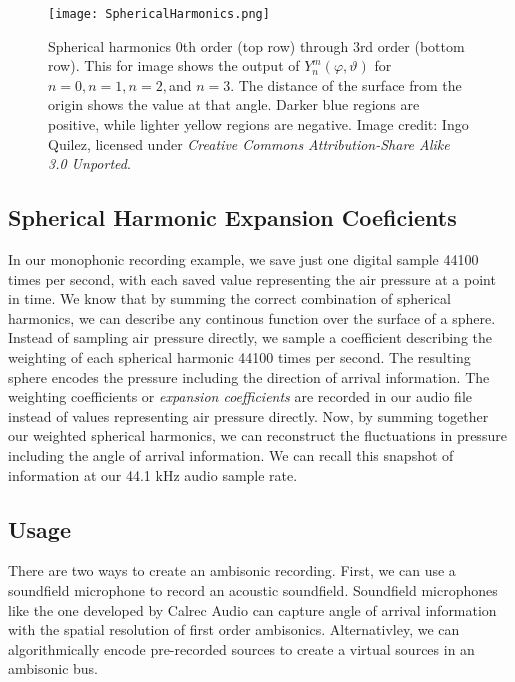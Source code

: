\begin{figure}[h]
  \texttt{[image: SphericalHarmonics.png]}
  \caption{Spherical harmonics $0$th order (top row) through $3$rd
    order (bottom row). This for image shows the output of
    $Y_{n}^{m}(\varphi,\vartheta)$ for $n=0,n=1,n=2,$and $n=3$. The
    distance of the surface from the origin shows the value at that
    angle. Darker blue regions are positive, while lighter yellow
    regions are negative. Image credit: Ingo Quilez, licensed under
    \textit{Creative Commons Attribution-Share Alike 3.0 Unported}.}
  \label{fig:spherical-harmonics}
\end{figure}

\subsection{Spherical Harmonic Expansion Coeficients}
\label{sec:spher-harm-expans}
In our monophonic recording example, we save just one digital sample
44100 times per second, with each saved value representing the air
pressure at a point in time. We know that by summing the correct
combination of spherical harmonics, we can describe any continous
function over the surface of a sphere. Instead of sampling air
pressure directly, we sample a coefficient describing the weighting of
each spherical harmonic 44100 times per second. The resulting sphere
encodes the pressure including the direction of arrival
information. The weighting coefficients or \textit{expansion
  coefficients} are recorded in our audio file instead of values
representing air pressure directly. Now, by summing together our
weighted spherical harmonics, we can reconstruct the fluctuations in
pressure including the angle of arrival information. We can recall
this snapshot of information at our 44.1 kHz audio sample rate.

\subsection{Usage}
\label{sec:usage}
There are two ways to create an ambisonic recording. First, we can use
a soundfield microphone to record an acoustic soundfield. Soundfield
microphones like the one developed by Calrec Audio can capture angle
of arrival information with the spatial resolution of first order
ambisonics.\cite[-1in]{Ferrar1979} Alternativley, we can algorithmically
encode pre-recorded sources to create a virtual sources in an
ambisonic bus.\cite[-0.4in]{Malham1995}

